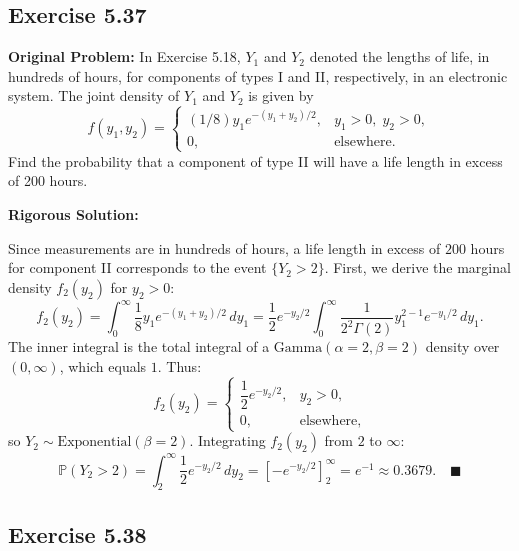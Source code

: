 \documentclass[11pt, letterpaper]{article}
\theoremstyle{definition}
\theoremstyle{remark}
\newcommand{\Prob}{\mathbb{P}}
\begin{document}
\subsection{Exercise 5.37}

\textbf{Original Problem:}
In Exercise 5.18, $Y_1$ and $Y_2$ denoted the lengths of life, in hundreds of hours, for components of types I and II, respectively, in an electronic system. The joint density of $Y_1$ and $Y_2$ is given by
\[ f(y_1, y_2) = \begin{cases} (1/8)y_1 e^{-(y_1+y_2)/2}, & y_1 > 0, \; y_2 > 0, \\ 0, & \text{elsewhere.} \end{cases} \]
Find the probability that a component of type II will have a life length in excess of 200 hours.

\textbf{Rigorous Solution:}

Since measurements are in hundreds of hours, a life length in excess of $200$ hours for component II corresponds to the event $\{Y_2 > 2\}$. First, we derive the marginal density $f_2(y_2)$ for $y_2 > 0$:
\[ f_2(y_2) = \int_0^\infty \frac{1}{8} y_1 e^{-(y_1+y_2)/2} \, dy_1 = \frac{1}{2} e^{-y_2/2} \int_0^\infty \frac{1}{2^2 \Gamma(2)} y_1^{2-1} e^{-y_1/2} \, dy_1. \]
The inner integral is the total integral of a $\text{Gamma}(\alpha = 2, \beta = 2)$ density over $(0, \infty)$, which equals $1$. Thus:
\[ f_2(y_2) = \begin{cases} \dfrac{1}{2} e^{-y_2/2}, & y_2 > 0, \\ 0, & \text{elsewhere,} \end{cases} \]
so $Y_2 \sim \text{Exponential}(\beta = 2)$. Integrating $f_2(y_2)$ from $2$ to $\infty$:
\[ \Prob(Y_2 > 2) = \int_2^\infty \frac{1}{2} e^{-y_2/2} \, dy_2 = \left[ -e^{-y_2/2} \right]_2^\infty = e^{-1} \approx 0.3679. \quad \blacksquare \]

\subsection{Exercise 5.38}
\end{document}
